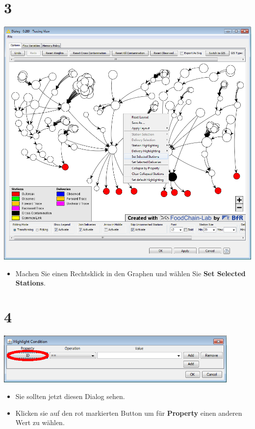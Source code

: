 \documentclass{beamer}
\begin{document}
\section{3}
\begin{frame}
	\begin{center}
  		\includegraphics[height=0.6\textheight]{3.png}
	\end{center}
	\begin{itemize}
		\item Machen Sie einen Rechtsklick in den Graphen und wählen Sie \textbf{Set Selected Stations}.
	\end{itemize}
\end{frame}

\section{4}
\begin{frame}
	\begin{center}
  		\includegraphics[width=0.9\textwidth]{4.png}
	\end{center}
	\begin{itemize}
		\item Sie sollten jetzt diesen Dialog sehen.
		\item Klicken sie auf den rot markierten Button um für \textbf{Property} einen anderen Wert zu wählen.
	\end{itemize}
\end{frame}
\end{document}
